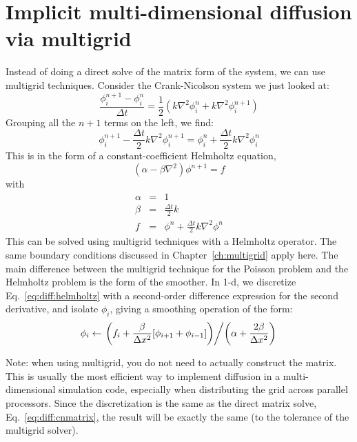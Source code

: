 \section{Implicit multi-dimensional diffusion via multigrid}

Instead of doing a direct solve of the matrix form of the system, we 
can use multigrid techniques.  Consider the Crank-Nicolson system we just 
looked at:
\begin{equation}
\frac{\phi^{n+1}_i - \phi^n_i}{\Delta t} = 
   \frac{1}{2} \left ( k \nabla^2 \phi^n_i + k \nabla^2 \phi^{n+1}_i \right )
\end{equation}
Grouping all the 
$n+1$ terms on the left, we find:
\begin{equation}
\phi^{n+1}_i - \frac{\Delta t}{2} k \nabla^2 \phi^{n+1}_i = 
    \phi^n_i + \frac{\Delta t}{2} k \nabla^2 \phi^n_i
\end{equation}
This is in the form of a constant-coefficient Helmholtz equation,
\begin{equation}
\label{eq:diff:helmholtz}
(\alpha - \beta \nabla^2) \phi^{n+1} = f
\end{equation}
with
\begin{eqnarray}
\alpha &=& 1 \\
\beta &=& \frac{\Delta t}{2} k \\
f &=& \phi^n + \frac{\Delta t}{2} k \nabla^2 \phi^n
\end{eqnarray}
This can be solved using multigrid techniques with a Helmholtz
operator.  The same boundary conditions discussed in
Chapter~\ref{ch:multigrid} apply here.  The main difference between
the multigrid technique for the Poisson problem and the Helmholtz
problem is the form of the smoother.  In 1-d, we discretize
Eq.~\ref{eq:diff:helmholtz} with a second-order difference expression
for the second derivative, and isolate $\phi_i$, giving a smoothing
operation of the form:
\begin{equation}
\phi_{i} \leftarrow
 \left .    \left ( f_{i} + \frac{\beta}{\Delta x^2} [\phi_{i+1}
                             + \phi_{i-1}] \right ) \middle / 
\left ( \alpha + \frac{2 \beta}{\Delta x^2}  \right )  \right .
\end{equation}

Note: when using multigrid, you do not need to actually construct the
matrix.  This is usually the most efficient way to implement diffusion
in a multi-dimensional simulation code, especially when distributing
the grid across parallel processors.  Since the discretization is the
same as the direct matrix solve, Eq.~\ref{eq:diff:cnmatrix}, the
result will be exactly the same (to the tolerance of the multigrid
solver).


